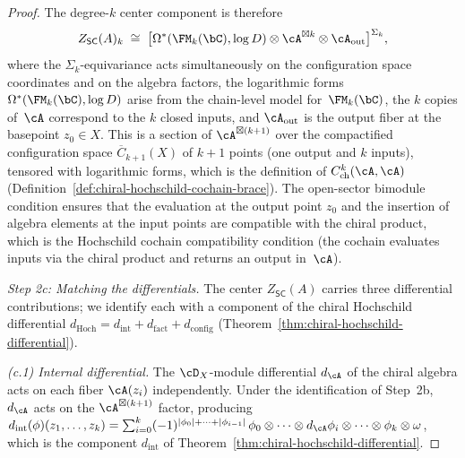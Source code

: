 \begin{proof}
The degree-$k$ center component is therefore
\begin{equation}\label{eq:center-bar-degree}
Z_{\mathsf{SC}}(A)_k
\;\cong\;
\bigl[\Omega^*(\FM_k(\bC), \log D)
\otimes \cA^{\boxtimes k}
\otimes \cA_{\mathrm{out}}\bigr]^{\Sigma_k},
\end{equation}
where the $\Sigma_k$-equivariance acts simultaneously on the
configuration space coordinates and on the algebra factors, the
logarithmic forms $\Omega^*(\FM_k(\bC), \log D)$ arise from the
chain-level model for~$\FM_k(\bC)$, the $k$ copies of~$\cA$
correspond to the $k$ closed inputs, and $\cA_{\mathrm{out}}$ is
the output fiber at the basepoint $z_0 \in X$. This is
a section of $\cA^{\boxtimes (k+1)}$ over the compactified
configuration space $\overline{C}_{k+1}(X)$ of $k+1$ points
(one output and $k$ inputs), tensored with logarithmic forms,
which is the definition of
$C^k_{\mathrm{ch}}(\cA, \cA)$
(Definition~\ref{def:chiral-hochschild-cochain-brace}).
The open-sector bimodule condition ensures that the evaluation
at the output point $z_0$ and the insertion of algebra elements
at the input points are compatible with the chiral product,
which is the Hochschild cochain compatibility condition
(the cochain evaluates inputs via the chiral product and
returns an output in~$\cA$).

\emph{Step 2c: Matching the differentials.}
The center $Z_{\mathsf{SC}}(A)$ carries three differential
contributions; we identify each with a component of the chiral
Hochschild differential
$d_{\mathrm{Hoch}} = d_{\mathrm{int}} + d_{\mathrm{fact}}
+ d_{\mathrm{config}}$
(Theorem~\ref{thm:chiral-hochschild-differential}).

\emph{(c.1) Internal differential.}
The $\cD_X$-module differential $d_\cA$ of the chiral algebra acts
on each fiber $\cA(z_i)$ independently. Under the identification of
Step~2b, $d_\cA$ acts on the $\cA^{\boxtimes (k+1)}$ factor,
producing
$d_{\mathrm{int}}(\phi)(z_1, \ldots, z_k)
= \sum_{i=0}^{k} (-1)^{|\phi_0| + \cdots + |\phi_{i-1}|}
\,\phi_0 \otimes \cdots \otimes d_\cA \phi_i \otimes \cdots
\otimes \phi_k \otimes \omega$,
which is the component $d_{\mathrm{int}}$ of
Theorem~\ref{thm:chiral-hochschild-differential}.


\end{proof}
